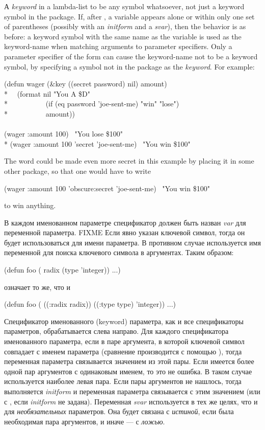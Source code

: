 \begin{newer}
А \emph{keyword} in a lambda-list
to be any symbol whatsoever, not just a keyword symbol
in the  package.  If, after ,
a variable appears alone or within only one set of parentheses
(possibly with an \emph{initform} and a \emph{svar}), then
the behavior is as before: a keyword symbol with the same name as
the variable is used as the keyword-name when matching arguments
to parameter specifiers.  Only a parameter specifier of the form
 can cause the keyword-name
not to be a keyword symbol, by specifying a symbol not in the 
package as the \emph{keyword}.
For example:
\begin{lisp}
(defun wager (\&key ((secret password) nil) amount) \\*
~~(format nil "You {\Xtilde}A \${\Xtilde}D" \\*
~~~~~~~~~~(if (eq password 'joe-sent-me) "win" "lose") \\*
~~~~~~~~~~amount)) \\
\\
(wager :amount 100) \EV\ "You lose \$100" \\*
(wager :amount 100 'secret 'joe-sent-me) \EV\ "You win \$100"
\end{lisp}
The  word could be made even more secret in this example
by placing it in some other  package, so that one would
have to write
\begin{lisp}
(wager :amount 100 'obscure:secret 'joe-sent-me) \EV\ "You win \$100"
\end{lisp}
to win anything.
\end{newer}

В каждом именованном параметре спецификатор должен быть назван \emph{var} для
переменной параметра. FIXME
Если явно указан ключевой символ, тогда он будет использоваться для имени
параметра. В противном случае используется имя переменной  для поиска
ключевого символа в аргументах. Таким образом:
\begin{lisp}
(defun foo ( radix (type 'integer)) ...)
\end{lisp}
означает то же, что и
\begin{lisp}
(defun foo ( ((:radix radix)) ((:type type) 'integer)) ...)
\end{lisp}

Спецификатор именованного (keyword) параметра, как и все спецификаторы
параметров, обрабатывается слева направо.
Для каждого спецификатора именованного параметра, если в паре аргумента, в
которой ключевой символ совпадает с именем параметра (сравнение производится с
помощью ), тогда переменная параметра связывается значением из этой
пары.
Если имеется более одной пар аргументов с одинаковым именем, то это не ошибка. В
таком случае используется наиболее левая пара.
Если пары аргументов не нашлось, тогда выполняется \emph{initform} и
переменная параметра связывается с этим значением (или с {\false}, если
\emph{initform} не задана). Переменная \emph{svar} используется в тех же
целях, что и для \emph{необязательных} параметров. Она будет связана с
\emph{истиной}, если была необходимая пара аргументов, и иначе --- с \emph{ложью}.

